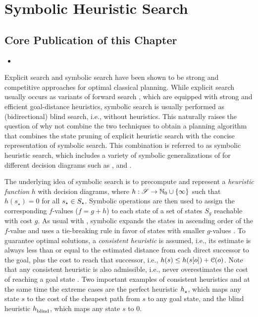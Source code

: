 \chapter{Symbolic Heuristic Search}\label{ch:symbolic_heuristic_search}

\section*{Core Publication of this Chapter}
\renewcommand{\citebf}[1]{\textbf{#1}}
\begin{itemize}
    \item {}
\end{itemize}
\renewcommand{\citebf}[1]{#1}

Explicit search and symbolic search have been shown to be strong and competitive approaches for optimal classical planning.
While explicit search usually occurs as variants of forward \astar{} search \autocite{hart-et-al-ieeessc1968}, which are equipped with strong and efficient goal-distance heuristics, symbolic search is usually performed as (bidirectional) blind search, i.e., without heuristics.
This naturally raises the question of why not combine the two techniques to obtain a planning algorithm that combines the state pruning of explicit heuristic search with the concise representation of symbolic search.
This combination is referred to as symbolic heuristic search, which includes a variety of symbolic generalizations of \astar{} for different decision diagrams such as \bddastar{} \autocite{edelkamp-reffel-ki1998}, \addastar{} \autocite{hansen-et-al-sara2002} and \evmddastar{} \autocite{speck-et-al-icaps2018}.

The underlying idea of symbolic \astar{} search is to precompute and represent a \emph{heuristic function} $h$ with decision diagrams, where $h: \mathscr S \to \mathbb{N}_0 \cup \{ \infty \}$ such that $h(s_\star) = 0$ for all $s_\star \in S_\star$.
Symbolic operations are then used to assign the corresponding $f$-values ($f = g + h$) to each state of a set of states $S_g$ reachable with cost $g$.
As usual with \astar{}, symbolic \astar{} expands the states in ascending order of the $f$-value and uses a tie-breaking rule in favor of states with smaller $g$-values \autocite{kissmann-edelkamp-aaai2011,torralba-phd2015}.
To guarantee optimal solutions, a \emph{consistent heuristic} is assumed, i.e., its estimate is always less than or equal to the estimated distance from each direct successor to the goal, plus the cost to reach that successor, i.e., $h(s) \leq h(s[o]) + \mathcal C(o)$.
Note that any consistent heuristic is also admissible, i.e., never overestimates the cost of reaching a goal state \autocite{pearl-1984}.
Two important examples of consistent heuristics and at the same time the extreme cases are the perfect heuristic $h_\text{\scriptsize{\ensuremath{\star}}}^\text{\scriptsize{}}{}$, which maps any state $s$ to the cost of the cheapest path from $s$ to any goal state, and the blind heuristic $h_\text{\scriptsize{blind}}^\text{\scriptsize{}}$, which maps any state $s$ to $0$.

